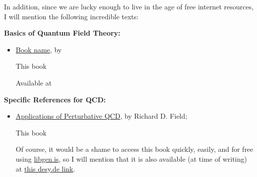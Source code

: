 In addition, since we are lucky enough to live in the age of free internet resources, I will mention the following incredible texts:

\textbf{Basics of Quantum Field Theory:}
\begin{itemize}
    \item
        \underline{Book name}, by 

        This book 

        Available at 
\end{itemize}


\textbf{Specific References for QCD:}
\begin{itemize}
    \item
        \underline{Applications of Perturbative QCD}, by Richard D. Field;

        This book 

        Of course, it would be a shame to access this book quickly, easily, and for free using \url{libgen.is}, so I will mention that it is also available (at time of writing) at \href{https://www.desy.de/~jung/qcd_and_mc_2009-2010/R.Field-Applications-of-pQCD.pdf}{this desy.de link}.
\end{itemize}
